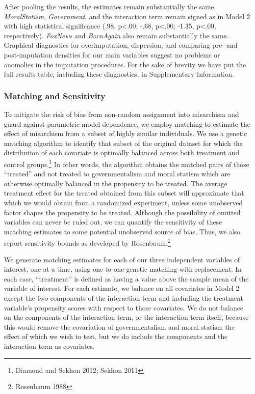 \documentclass[12pt,]{article}
\begin{document}
After pooling the results, the estimates remain substantially the same.
\emph{MoralStatism}, \emph{Government}, and the interaction term remain
signed as in Model 2 with high statistical significance (.98,
p\textless{}.00; -.68, p\textless{}.00; -1.35, p\textless{}.00,
respectively). \emph{FoxNews} and \emph{BornAgain} also remain
substantially the same. Graphical diagnostics for overimputation,
dispersion, and comparing pre- and post-imputation densities for our
main variables suggest no problems or anomolies in the imputation
procedures. For the sake of brevity we have put the full results table,
including these diagnostics, in Supplementary Information.

\subsubsection{Matching and Sensitivity}\label{matching-and-sensitivity}

To mitigate the risk of bias from non-random assignment into misarchism
and guard against parametric model dependence, we employ matching to
estimate the effect of misarchism from a subset of highly similar
individuals. We use a genetic matching algorithm to identify that subset
of the original dataset for which the distribution of each covariate is
optimally balanced across both treatment and control groups.\footnote{Diamond
  and Sekhon 2012; Sekhon 2011} In other words, the algorithm obtains
the matched pairs of those ``treated'' and not treated to
governmentalism and moral statism which are otherwise optimally balanced
in the propensity to be treated. The average treatment effect for the
treated obtained from this subset will approximate that which we would
obtain from a randomized experiment, unless some unobserved factor
shapes the propensity to be treated. Although the possibility of omitted
variables can never be ruled out, we can quantify the sensitivity of
these matching estimates to some potential unobserved source of bias.
Thus, we also report sensitivity bounds as developed by
Rosenbaum.\footnote{Rosenbaum 1988}

We generate matching estimates for each of our three independent
variables of interest, one at a time, using one-to-one genetic matching
with replacement. In each case, ``treatment'' is defined as having a
value above the sample mean of the variable of interest. For each
estimate, we balance on all covariates in Model 2 except the two
components of the interaction term and including the treatment
variable's propensity scores with respect to those covariates. We do not
balance on the components of the interaction term, or the interaction
term itself, because this would remove the covariation of
governmentalism and moral statism the effect of which we wish to test,
but we do include the components and the interaction term as covariates.
\end{document}
